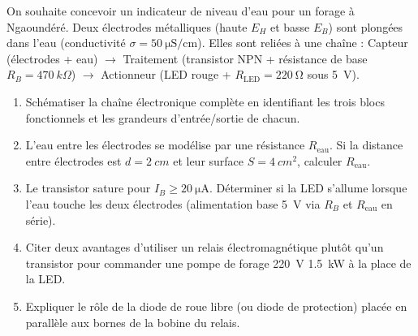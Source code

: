 \documentclass[11pt]{article}
\begin{document}
\begin{exercice}
On souhaite concevoir un indicateur de niveau d'eau pour un forage à Ngaoundéré. Deux électrodes métalliques (haute $E_H$ et basse $E_B$) sont plongées dans l'eau (conductivité $\sigma = \SI{50}{\micro\siemens\per\centi\meter}$). Elles sont reliées à une chaîne : Capteur (électrodes + eau) $\rightarrow$ Traitement (transistor NPN + résistance de base $R_B = \SI{470}{k\Omega}$) $\rightarrow$ Actionneur (LED rouge + $R_{\text{LED}} = \SI{220}{\ohm}$ sous \SI{5}{V}).
\begin{enumerate}
    \item Schématiser la chaîne électronique complète en identifiant les trois blocs fonctionnels et les grandeurs d'entrée/sortie de chacun.
    \item L'eau entre les électrodes se modélise par une résistance $R_{\text{eau}}$. Si la distance entre électrodes est $d = \SI{2}{cm}$ et leur surface $S = \SI{4}{cm^2}$, calculer $R_{\text{eau}}$.
    \item Le transistor sature pour $I_B \ge \SI{20}{\micro\ampere}$. Déterminer si la LED s'allume lorsque l'eau touche les deux électrodes (alimentation base \SI{5}{V} via $R_B$ et $R_{\text{eau}}$ en série).
    \item Citer deux avantages d'utiliser un relais électromagnétique plutôt qu'un transistor pour commander une pompe de forage \SI{220}{V} \SI{1,5}{kW} à la place de la LED.
    \item Expliquer le rôle de la diode de roue libre (ou diode de protection) placée en parallèle aux bornes de la bobine du relais.
\end{enumerate}
\end{exercice}
\end{document}
